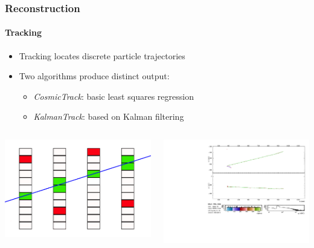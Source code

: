 \documentclass[10pt,professionalfonts,xcolor=table]{beamer}
\begin{document}
\begin{frame}

\frametitle{Reconstruction}
\framesubtitle{Tracking}

\begin{itemize}
\item Tracking locates discrete particle trajectories
\gap
\item Two algorithms produce distinct output:
  \begin{itemize}
  \item \textit{CosmicTrack}: basic least squares regression
  \item \textit{KalmanTrack}: based on Kalman filtering
  \end{itemize}
\end{itemize}
\gap
\gap
\gap
\begin{columns}[c]
\centering
\includegraphics[width=\textwidth]{figures/figures/tracking.jpg}

\centering
\includegraphics[height=\textwidth, angle=-90]{figures/evd_steps/evd_track_zoom.pdf}


\end{columns}
\end{frame}
\end{document}

